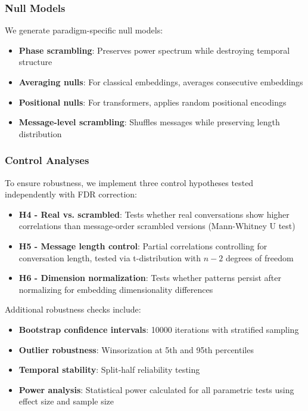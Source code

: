 \documentclass[11pt,letterpaper]{article}
\newcommand{\bootstrapIterations}{10000}
\begin{document}
\subsubsection{Null Models}

We generate paradigm-specific null models:
\begin{itemize}
\item \textbf{Phase scrambling}: Preserves power spectrum while destroying temporal structure
\item \textbf{Averaging nulls}: For classical embeddings, averages consecutive embeddings
\item \textbf{Positional nulls}: For transformers, applies random positional encodings
\item \textbf{Message-level scrambling}: Shuffles messages while preserving length distribution
\end{itemize}

\subsubsection{Control Analyses}

To ensure robustness, we implement three control hypotheses tested independently with FDR correction:

\begin{itemize}
\item \textbf{H4 - Real vs. scrambled}: Tests whether real conversations show higher correlations than message-order scrambled versions (Mann-Whitney U test)
\item \textbf{H5 - Message length control}: Partial correlations controlling for conversation length, tested via t-distribution with $n-2$ degrees of freedom
\item \textbf{H6 - Dimension normalization}: Tests whether patterns persist after normalizing for embedding dimensionality differences
\end{itemize}

Additional robustness checks include:
\begin{itemize}
\item \textbf{Bootstrap confidence intervals}: \bootstrapIterations{} iterations with stratified sampling
\item \textbf{Outlier robustness}: Winsorization at 5th and 95th percentiles
\item \textbf{Temporal stability}: Split-half reliability testing
\item \textbf{Power analysis}: Statistical power calculated for all parametric tests using effect size and sample size
\end{itemize}
\end{document}
